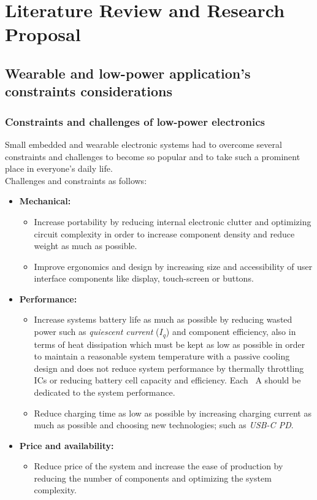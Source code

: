 \documentclass[report.tex]{subfiles}
\begin{document}
\chapter{Literature Review and Research Proposal}

\section{Wearable and low-power application's constraints considerations}

\subsection{Constraints and challenges of low-power electronics}
Small embedded and wearable electronic systems had to overcome several constraints and challenges to become so popular and to take such a prominent place in everyone's daily life.\\

Challenges and constraints as follows:
\begin{itemize}
\item \textbf{Mechanical:}
\begin{itemize}
\item Increase portability by reducing internal electronic clutter and optimizing circuit complexity in order to increase component density and reduce weight as much as possible.
\item Improve ergonomics and design by increasing size and accessibility of user interface components like display, touch-screen or buttons.
\end{itemize}
\item \textbf{Performance:}
\begin{itemize}
\item Increase systems battery life as much as possible by reducing wasted power such as \textit{quiescent current} ($I_q$) and component efficiency, also in terms of heat dissipation which must be kept as low as possible in order to maintain a reasonable system temperature with a passive cooling design and does not reduce system performance by thermally throttling ICs or reducing battery cell capacity and efficiency. Each \si{\mu\ampere} should be dedicated to the system performance.
\item Reduce charging time as low as possible by increasing charging current as much as possible and choosing new technologies; such as \textit{USB-C PD}.
\end{itemize}
\item \textbf{Price and availability:}
\begin{itemize}
\item Reduce price of the system and increase the ease of production by reducing the number of components and optimizing the system complexity.\\
\end{itemize}
\end{itemize}
\end{document}
